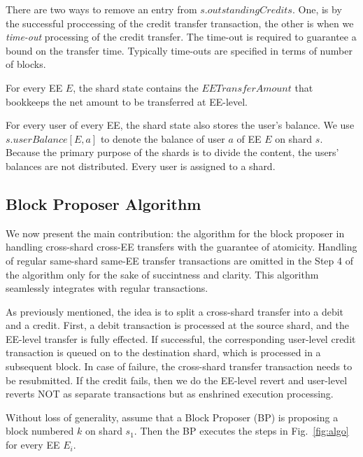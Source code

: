 \documentclass{IEEEtran}
\begin{document}
There are two ways to remove an entry from $s.outstandingCredits$. One, is by the successful proccessing of the credit transfer transaction, the other is when we {\em time-out} processing of the credit transfer. The time-out is required to guarantee a bound on the transfer time. Typically time-outs are specified in terms of number of blocks.

For every EE $E$, the shard state contains the $EETransferAmount$ that bookkeeps the net amount to be transferred at EE-level.

For every user of every EE, the shard state also stores the user's balance. We use $s.userBalance[E,a]$ to denote the balance of user $a$ of EE $E$ on shard $s$. Because the primary purpose of the shards is to divide the content, the users' balances are not distributed. Every user is assigned to a shard.

\subsection{Block Proposer Algorithm}
\label{sec:BP}
We now present the main contribution: the algorithm for the block proposer in handling cross-shard cross-EE transfers with the guarantee of atomicity. Handling of regular same-shard same-EE transfer transactions are omitted in the Step 4 of the algorithm only for the sake of succintness and clarity. This algorithm seamlessly integrates with regular transactions. 

As previously mentioned, the idea is to split a cross-shard transfer into a debit and a credit. First, a debit transaction is processed at the source shard, and the EE-level transfer is fully effected. If successful, the corresponding user-level credit transaction is queued on to the destination shard, which is processed in a subsequent block. In case of failure, the cross-shard transfer transaction needs to be resubmitted. If the credit fails, then we do the EE-level revert and user-level reverts NOT as separate transactions but as enshrined execution processing. 

Without loss of generality, assume that a Block Proposer (BP) is proposing a block numbered $k$ on shard $s_1$. Then the BP executes the steps in Fig.~\ref{fig:algo} for every EE $E_i$.
\end{document}
